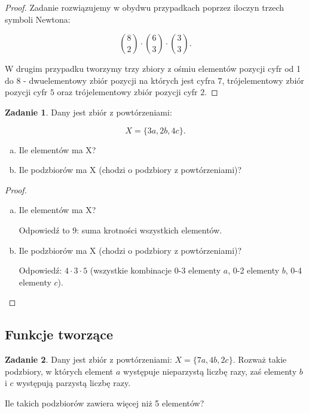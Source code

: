 \documentclass[11pt]{article}
\theoremstyle{definition}
\newtheorem{zadanie}{Zadanie}
\numberwithin{zadanie}{subsection}
\begin{document}
\begin{proof}
    Zadanie rozwiązujemy w obydwu przypadkach poprzez iloczyn trzech symboli Newtona:

    $$\binom 82\cdot\binom 63\cdot\binom 33.$$

    W drugim przypadku tworzymy trzy zbiory z ośmiu elementów pozycji cyfr od 1 do 8 - dwuelementowy zbiór pozycji na których jest cyfra $7$, trójelementowy zbiór pozycji cyfr $5$ oraz trójelementowy zbiór pozycji cyfr $2$.
\end{proof}
\begin{zadanie}
    Dany jest zbiór z powtórzeniami:

    $$X = \{3a, 2b, 4c\}.$$

    \begin{enumerate}[a)]
        \item Ile elementów ma X?
        \item Ile podzbiorów ma X (chodzi o podzbiory z powtórzeniami)?
    \end{enumerate}
\end{zadanie}
\begin{proof}
    \begin{enumerate}[a)]
        \item Ile elementów ma X?

              Odpowiedź to 9: suma krotności wszystkich elementów.

        \item Ile podzbiorów ma X (chodzi o podzbiory z powtórzeniami)?

              Odpowiedź: $4\cdot3\cdot5$ (wszystkie kombinacje 0-3 elementy $a$, 0-2 elementy $b$, 0-4 elementy $c$).
    \end{enumerate}
\end{proof}

\subsection{Funkcje tworzące}
\begin{zadanie}
    Dany jest zbiór z powtórzeniami: $X=\{7a, 4b, 2c\}$. Rozważ takie podzbiory, w których element $a$ występuje nieparzystą liczbę razy, zaś elementy $b$ i $c$ występują parzystą liczbę razy.

    Ile takich podzbiorów zawiera więcej niż 5 elementów?
\end{zadanie}
\end{document}
